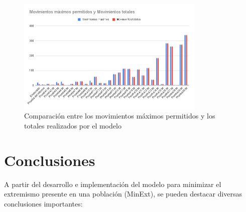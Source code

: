 \documentclass[11pt,letter]{article}
\begin{document}
\begin{figure}[H]
    \centering
    \includegraphics[width=0.8\textwidth]{resources/movimientosmaximosytotales.png}
    \caption{Comparación entre los movimientos máximos permitidos y los totales realizados por el modelo}
\end{figure}

\section{Conclusiones}

A partir del desarrollo e implementación del modelo para minimizar el extremismo presente en una población (MinExt), se pueden destacar diversas conclusiones importantes:
\end{document}

